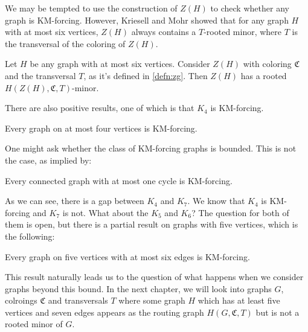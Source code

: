 We may be tempted to use the construction of \( Z(H) \) to check whether any graph is KM-forcing. 
However, Kriesell and Mohr showed that for any graph \( H \) with at most six vertices, \( Z(H) \) always contains a \( T \)-rooted minor, where $T$ is the transversal of 
the coloring of $Z(H)$. 

\begin{thm}\label{thm:zg-for-k_6}
    Let $H$ be any graph with at most six vertices. Consider $Z(H)$ with coloring
    $\mathfrak{C}$ and the transversal $T$, as it's defined in \ref{defn:zg}. Then $Z(H)$ has a 
    rooted $H(Z(H), \mathfrak{C}, T)$-minor.
\end{thm}


There are also positive results, one of which is that $K_4$ is KM-forcing.

\begin{thm}\label{thm:6}
Every graph on at most four vertices is KM-forcing.
\end{thm}

One might ask whether the class of KM-forcing graphs is bounded. 
This is not the case, as implied by:

\begin{thm}\label{thm:4}
Every connected graph with at most one cycle is KM-forcing.
\end{thm}

As we can see, there is a gap between $K_4$ and $K_7$. We know that $K_4$ is KM-forcing and $K_7$ is not. What about the $K_5$ and $K_6$? The question for both of them is open, but there is a partial result on graphs with five 
vertices, which is the following:

\begin{thm}\label{thm:5}
Every graph on five vertices with at most six edges is KM-forcing.
\end{thm}

This result naturally leads us to the question of what happens when we consider graphs beyond this bound. 
In the next chapter, we will look into graphs \( G \), colroings $\mathfrak{C}$ and transversals
$T$ where some graph \( H \) which has at least five vertices and 
seven edges appears as the routing graph \( H(G, \mathfrak{C}, T) \) but is not a rooted minor of \( G \).